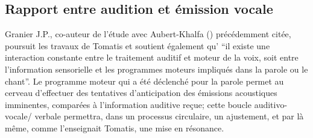 \subsection{Rapport entre audition et émission vocale}
Granier J.P., co-auteur de l'étude  avec Aubert-Khalfa 
(\citeyear{affectiveDisorders}) précédemment citée, poursuit les travaux 
de Tomatis et soutient 
également qu' ``il existe une
interaction
constante entre  le traitement auditif et moteur de la
voix, soit entre l'information sensorielle et les programmes moteurs impliqués
dans la parole ou le chant''.
Le programme moteur qui a été déclenché
pour la parole permet au cerveau d'effectuer des tentatives d'anticipation
des émissions acoustiques imminentes, comparées à l'information
auditive reçue; cette boucle
auditivo-vocale/ verbale permettra, dans un processus circulaire, un ajustement,
et par là même, comme l'enseignait Tomatis, une mise en résonance.

